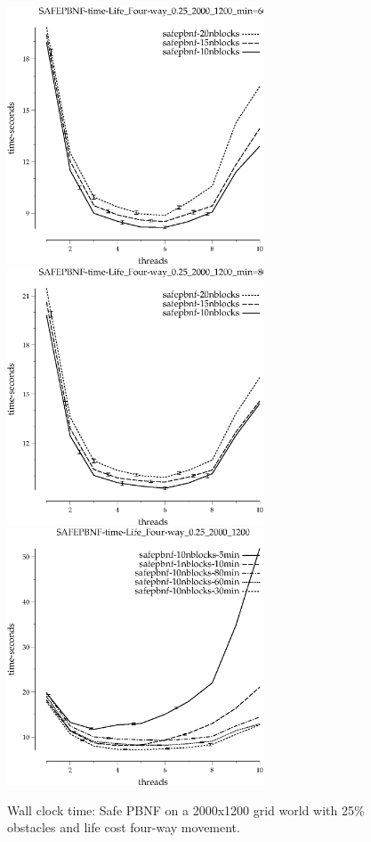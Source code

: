 \documentclass{article}
\begin{document}
\begin{figure}[t]
\begin{center}
\includegraphics[width=3in]{grid_life_four-way_0.25_2000_1200/SAFEPBNF-time-Life_Four-way_0.25_2000_1200_min=60.eps}
\includegraphics[width=3in]{grid_life_four-way_0.25_2000_1200/SAFEPBNF-time-Life_Four-way_0.25_2000_1200_min=80.eps}
\includegraphics[width=3in]{grid_life_four-way_0.25_2000_1200/SAFEPBNF-time-Life_Four-way_0.25_2000_1200.eps}
\caption{Wall clock time: Safe PBNF on a 2000x1200 grid world with 25\%
  obstacles and life cost four-way movement.}
\end{center}
\end{figure}
\end{document}
